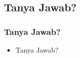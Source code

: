\documentclass[xcolor=table, notheorems, hyperref={pdfpagelabels=false}]{beamer}
\begin{document}
\begin{frame}[fragile]
\section{Tanya Jawab?}
\frametitle{Tanya Jawab?}
\begin{itemize}
\item Tanya Jawab?
\end{itemize}
\end{frame}


\end{document}
